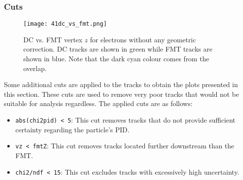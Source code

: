 \subsubsection{Cuts}
\label{12.41::cuts}
    \begin{figure}[b!]
        \texttt{[image: 41dc\_vs\_fmt.png]}
        \caption[DC vs. FMT $z$ without geometric correction]
        {DC vs. FMT vertex $z$ for electrons without any geometric correction.
        DC tracks are shown in green while FMT tracks are shown in blue.
        Note that the dark cyan colour comes from the overlap.}
        \label{fig::12.41::dc_vs_fmt_vz_11983}
    \end{figure}

    Some additional cuts are applied to the tracks to obtain the plots presented in this section.
    These cuts are used to remove very poor tracks that would not be suitable for analysis regardless.
    The applied cuts are as follows:
    \begin{itemize}
        \item
            \texttt{abs(chi2pid) < 5}:
            This cut removes tracks that do not provide sufficient certainty regarding the particle's PID.
        \item
            \texttt{vz < fmtZ}:
            This cut removes tracks located further downstream than the FMT.
        \item
            \texttt{chi2/ndf < 15}:
            This cut excludes tracks with excessively high uncertainty.
    \end{itemize}
